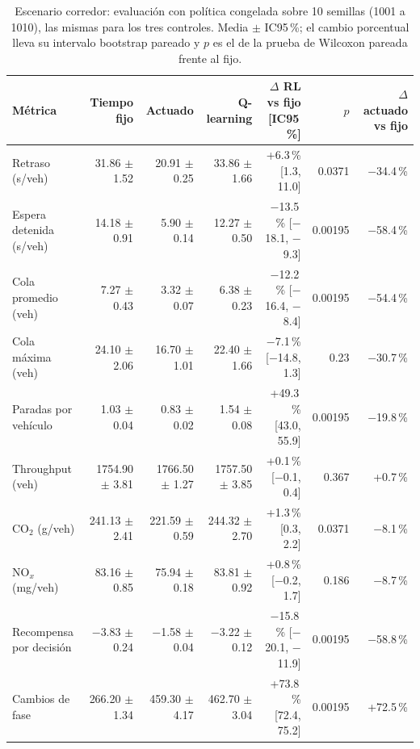 \begin{table}[H]
\centering
\scriptsize
\setlength{\tabcolsep}{3pt}
\begin{tabular}{lrrrrrr}
\toprule
Métrica & Tiempo fijo & Actuado & Q-learning & \makecell{$\Delta$ RL vs fijo\\{}[IC95\,\%]} & $p$ & \makecell{$\Delta$ actuado\\vs fijo} \\
\midrule
Retraso (s/veh) & 31.86 $\pm$ 1.52 & 20.91 $\pm$ 0.25 & 33.86 $\pm$ 1.66 & +6.3\,\% [1.3, 11.0] & 0.0371 & $-$34.4\,\% \\
Espera detenida (s/veh) & 14.18 $\pm$ 0.91 & 5.90 $\pm$ 0.14 & 12.27 $\pm$ 0.50 & $-$13.5\,\% [$-$18.1, $-$9.3] & 0.00195 & $-$58.4\,\% \\
Cola promedio (veh) & 7.27 $\pm$ 0.43 & 3.32 $\pm$ 0.07 & 6.38 $\pm$ 0.23 & $-$12.2\,\% [$-$16.4, $-$8.4] & 0.00195 & $-$54.4\,\% \\
Cola máxima (veh) & 24.10 $\pm$ 2.06 & 16.70 $\pm$ 1.01 & 22.40 $\pm$ 1.66 & $-$7.1\,\% [$-$14.8, 1.3] & 0.23 & $-$30.7\,\% \\
Paradas por vehículo & 1.03 $\pm$ 0.04 & 0.83 $\pm$ 0.02 & 1.54 $\pm$ 0.08 & +49.3\,\% [43.0, 55.9] & 0.00195 & $-$19.8\,\% \\
Throughput (veh) & 1754.90 $\pm$ 3.81 & 1766.50 $\pm$ 1.27 & 1757.50 $\pm$ 3.85 & +0.1\,\% [$-$0.1, 0.4] & 0.367 & +0.7\,\% \\
CO$_2$ (g/veh) & 241.13 $\pm$ 2.41 & 221.59 $\pm$ 0.59 & 244.32 $\pm$ 2.70 & +1.3\,\% [0.3, 2.2] & 0.0371 & $-$8.1\,\% \\
NO$_x$ (mg/veh) & 83.16 $\pm$ 0.85 & 75.94 $\pm$ 0.18 & 83.81 $\pm$ 0.92 & +0.8\,\% [$-$0.2, 1.7] & 0.186 & $-$8.7\,\% \\
Recompensa por decisión & $-$3.83 $\pm$ 0.24 & $-$1.58 $\pm$ 0.04 & $-$3.22 $\pm$ 0.12 & $-$15.8\,\% [$-$20.1, $-$11.9] & 0.00195 & $-$58.8\,\% \\
Cambios de fase & 266.20 $\pm$ 1.34 & 459.30 $\pm$ 4.17 & 462.70 $\pm$ 3.04 & +73.8\,\% [72.4, 75.2] & 0.00195 & +72.5\,\% \\
\bottomrule
\end{tabular}
\caption[Escenario corredor: evaluación con política congelada]{Escenario corredor: evaluación con política congelada sobre 10 semillas (1001 a 1010), las mismas para los tres controles. Media $\pm$ IC95\,\%; el cambio porcentual lleva su intervalo bootstrap pareado y $p$ es el de la prueba de Wilcoxon pareada frente al fijo.}
\label{tab:corredor-evaluacion}
\end{table}
